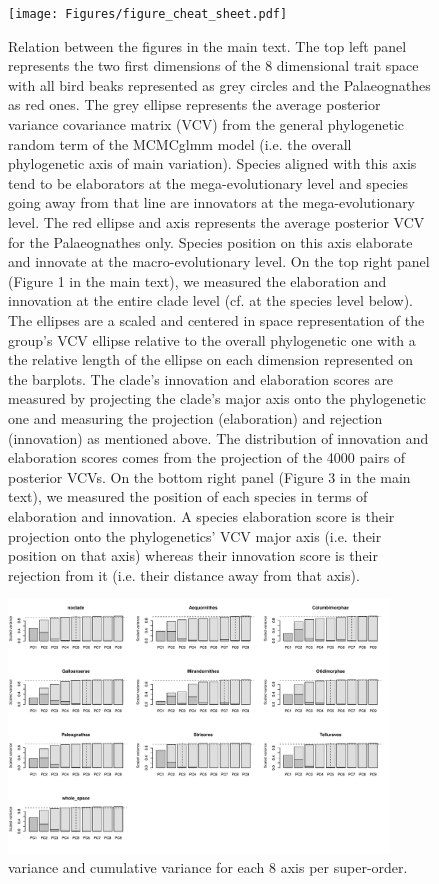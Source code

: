 \documentclass[sn-mathphys]{sn-jnl}%
\theoremstyle{thmstyleone}%
\theoremstyle{thmstyletwo}%
\theoremstyle{thmstylethree}%
\begin{document}
\begin{figure}[!htbp]
\centering
   \texttt{[image: Figures/figure\_cheat\_sheet.pdf]}
\caption{Relation between the figures in the main text.
The top left panel represents the two first dimensions of the 8 dimensional trait space with all bird beaks represented as grey circles and the Palaeognathes as red ones.
The grey ellipse represents the average posterior variance covariance matrix (VCV) from the general phylogenetic random term of the MCMCglmm model (i.e. the overall phylogenetic axis of main variation).
Species aligned with this axis tend to be elaborators at the mega-evolutionary level and species going away from that line are innovators at the mega-evolutionary level.
The red ellipse and axis represents the average posterior VCV for the Palaeognathes only.
Species position on this axis elaborate and innovate at the macro-evolutionary level.
On the top right panel (Figure 1 in the main text), we measured the elaboration and innovation at the entire clade level (cf. at the species level below).
The ellipses are a scaled and centered in space representation of the group’s VCV ellipse relative to the overall phylogenetic one with a the relative length of the ellipse on each dimension represented on the barplots.
The clade's innovation and elaboration scores are measured by projecting the clade's major axis onto the phylogenetic one and measuring the projection (elaboration) and rejection (innovation) as mentioned above.
The distribution of innovation and elaboration scores comes from the projection of the 4000 pairs of posterior VCVs.
On the bottom right panel (Figure 3 in the main text), we measured the position of each species in terms of elaboration and innovation.
A species elaboration score is their projection onto the phylogenetics' VCV major axis (i.e. their position on that axis) whereas their innovation score is their rejection from it (i.e. their distance away from that axis).}
\label{Fig:cheat_sheet}
\end{figure}


\begin{figure}[!htbp]
\centering
   \includegraphics[width=0.9\textwidth]{Figures/Supplementary_figure_axis_selection.pdf}
\caption{variance and cumulative variance for each 8 axis per super-order.}
\label{Fig:axes_variance}
\end{figure}
\end{document}
